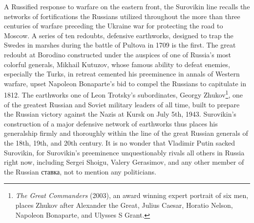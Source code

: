\documentclass[10pt,a4paper,twoside]{article} %
\begin{document}
\begin{multicols}{2}
{\newline \indent A Russified response to warfare on the eastern front, the Surovikin line recalls the networks of fortifications the Russians utilized throughout the more than three centuries of warfare preceding the Ukraine war for protecting the road to Moscow. A series of ten  redoubts, defensive earthworks, designed to trap the Swedes in marshes during the battle of Pultova in 1709 is the first. The great redoubt at Borodino constructed under the auspices of one of Russia's most colorful generals, Mikhail Kutuzov, whose famous ability to defeat enemies, especially the Turks, in retreat cemented his preeminence in annals of Western warfare, upset Napoleon Bonaparte's bid to compel the Russians to capitulate in 1812. The earthworks one of Leon Trotsky's subordinates, Georgy Zhukov\footnote{\emph{The Great Commanders} (2003), an award winning expert portrait of six men, places Zhukov after Alexander the Great, Julius Caesar, Horatio Nelson, Napoleon Bonaparte, and Ulysses S Grant.}, one of the greatest Russian and Soviet military leaders of all time, built to prepare the Russian victory against the Nazis at Kursk on July 5th, 1943. Surovikin's construction of a major defensive network of earthworks thus places his generalship firmly and thoroughly within the line of the great Russian generals of the 18th, 19th, and 20th century. It is no wonder that Vladimir Putin sacked Surovikin, for Surovikin's preeminence unquestionably rivals all others in Russia right now, including Sergei Shoigu, Valery Gerasimov, and any other member of the Russian \textrussian{ставка}, not to mention any politicians. 

}


\end{multicols}
\end{document}
